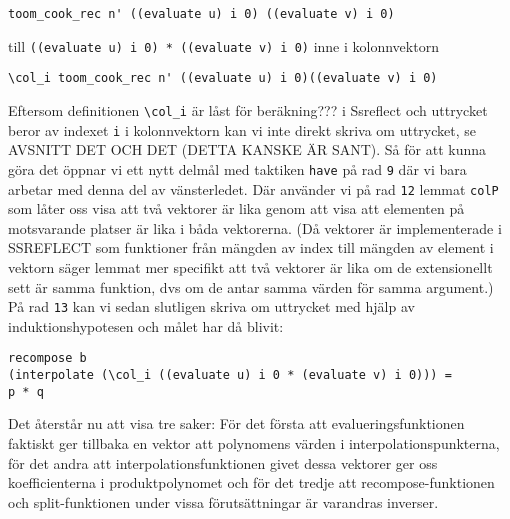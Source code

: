 \begin{verbatim}
toom_cook_rec n' ((evaluate u) i 0) ((evaluate v) i 0)
\end{verbatim}
till \verb=((evaluate u) i 0) * ((evaluate v) i 0)= inne i kolonnvektorn
\begin{verbatim}
\col_i toom_cook_rec n' ((evaluate u) i 0)((evaluate v) i 0)
\end{verbatim}
Eftersom definitionen \verb=\col_i= är låst för beräkning??? i Ssreflect och
uttrycket beror av indexet \verb+i+ i kolonnvektorn kan vi inte direkt skriva
om uttrycket, se AVSNITT DET OCH DET (DETTA KANSKE ÄR SANT). Så för att kunna
göra det öppnar vi ett nytt delmål med taktiken \verb=have= på rad \verb+9+ där
vi bara arbetar med denna del av vänsterledet. Där använder vi på rad \verb+12+
lemmat \verb=colP= som låter oss visa att två vektorer är lika genom att visa
att elementen på motsvarande platser är lika i båda vektorerna. (Då vektorer är
implementerade i SSREFLECT som funktioner från mängden av index till mängden av
element i vektorn säger lemmat mer specifikt att två vektorer är lika om de
extensionellt sett är samma funktion, dvs om de antar samma värden för samma
argument.) På rad \verb+13+ kan vi sedan slutligen skriva om uttrycket med
hjälp av induktionshypotesen och målet har då blivit:
\begin{verbatim}
recompose b
(interpolate (\col_i ((evaluate u) i 0 * (evaluate v) i 0))) =
p * q
\end{verbatim}
Det återstår nu att visa tre saker: För det första att evalueringsfunktionen
faktiskt ger tillbaka en vektor att polynomens värden i
interpolationspunkterna, för det andra att interpolationsfunktionen givet dessa
vektorer ger oss koefficienterna i produktpolynomet och för det tredje att
recompose-funktionen och split-funktionen under vissa förutsättningar är
varandras inverser.

